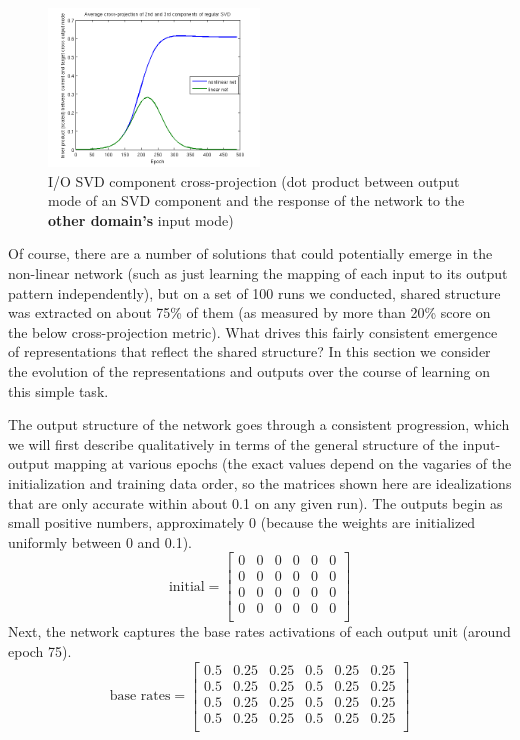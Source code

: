 \documentclass[10pt,letterpaper]{article}
\begin{document}
\begin{figure}
\includegraphics[width=0.5\textwidth]{figures/SVD_cross_projection_learning.png}
\caption{I/O SVD component cross-projection (dot product between output mode of an SVD component and the response of the network to the \textbf{other domain's} input mode)}
\label{SVD_cross_projection_learning}
\end{figure}
Of course, there are a number of solutions that could potentially emerge in the non-linear network (such as just learning the mapping of each input to its output pattern independently), but on a set of 100 runs we conducted, shared structure was extracted on about 75\% of them (as measured by more than 20\% score on the below cross-projection metric). What drives this fairly consistent emergence of representations that reflect the shared structure? In this section we consider the evolution of the representations and outputs over the course of learning on this simple task. \par 
The output structure of the network goes through a consistent progression, which we will first describe qualitatively in terms of the general structure of the input-output mapping at various epochs (the exact values depend on the vagaries of the initialization and training data order, so the matrices shown here are idealizations that are only accurate within about 0.1 on any given run). The outputs begin as small positive numbers, approximately 0 (because the weights are initialized uniformly between 0 and 0.1). 
\[ 
\text{initial} = \left[ \begin{matrix} 
0 & 0 & 0 & 0 & 0 & 0 \\
0 & 0 & 0 & 0 & 0 & 0 \\
 0 & 0 & 0 & 0 & 0 & 0\\
 0 & 0 & 0 & 0 & 0 & 0\\
\end{matrix}  \right] 
\] 
Next, the network captures the base rates activations of each output unit (around epoch 75).
\[ 
\text{base rates} = \left[ \begin{matrix} 
0.5 & 0.25 & 0.25 & 0.5 & 0.25 & 0.25 \\
0.5 & 0.25 & 0.25 & 0.5 & 0.25 & 0.25 \\
 0.5 & 0.25 & 0.25 & 0.5 & 0.25 & 0.25\\
 0.5 & 0.25 & 0.25 & 0.5 & 0.25 & 0.25\\
\end{matrix}  \right] 
\] 
\end{document}
